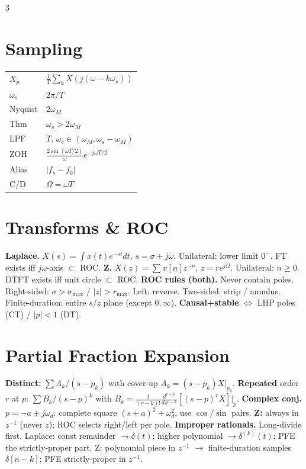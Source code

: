 \documentclass[11pt]{extarticle}
\begin{document}
\begin{paracol}{3}
\vspace{6pt}
\section*{Sampling}
\begin{tabular}{@{}l l@{}}
\toprule
$X_p$ & $\tfrac{1}{T}\!\sum_k X(j(\omega{-}k\omega_s))$ \\
$\omega_s$ & $2\pi/T$ \\
Nyquist & $2\omega_M$ \\
Thm & $\omega_s{>}2\omega_M$ \\
LPF & $T$, $\omega_c{\in}(\omega_M,\omega_s{-}\omega_M)$ \\
ZOH & $\tfrac{2\sin(\omega T/2)}{\omega}e^{-j\omega T/2}$ \\
Alias & $|f_s{-}f_0|$ \\
C/D & $\Omega{=}\omega T$ \\
\bottomrule
\end{tabular}

\switchcolumn

\section*{Transforms \& ROC}
\textbf{Laplace.} $X(s)=\!\int x(t)e^{-st}dt$, $s=\sigma+j\omega$. Unilateral: lower limit $0^-$. FT exists iff $j\omega$-axis $\subset$ ROC.
\textbf{Z.} $X(z)=\!\sum x[n]z^{-n}$, $z=re^{j\Omega}$. Unilateral: $n\ge 0$. DTFT exists iff unit circle $\subset$ ROC.
\textbf{ROC rules (both).} Never contain poles. Right-sided: $\sigma>\sigma_{\max}$ / $|z|>r_{\max}$. Left: reverse. Two-sided: strip / annulus. Finite-duration: entire $s$/$z$ plane (except $0,\infty$). \textbf{Causal+stable} $\Leftrightarrow$ LHP poles (CT) / $|p|<1$ (DT).

\section*{Partial Fraction Expansion}
\textbf{Distinct:} $\sum A_k/(s-p_k)$ with cover-up $A_k=(s-p_k)X|_{p_k}$.
\textbf{Repeated} order $r$ at $p$: $\sum B_k/(s-p)^k$ with $B_k=\tfrac{1}{(r-k)!}\tfrac{d^{r-k}}{ds^{r-k}}[(s-p)^r X]|_p$.
\textbf{Complex conj.} $p=-a\pm j\omega_d$: complete square $(s+a)^2+\omega_d^2$, use $\cos/\sin$ pairs.
\textbf{Z:} always in $z^{-1}$ (never $z$); ROC selects right/left per pole.
\textbf{Improper rationals.} Long-divide first. Laplace: const remainder $\to\delta(t)$; higher polynomial $\to\delta^{(k)}(t)$; PFE the strictly-proper part. Z: polynomial piece in $z^{-1}$ $\to$ finite-duration samples $\delta[n{-}k]$; PFE strictly-proper in $z^{-1}$.


\end{paracol}
\end{document}
